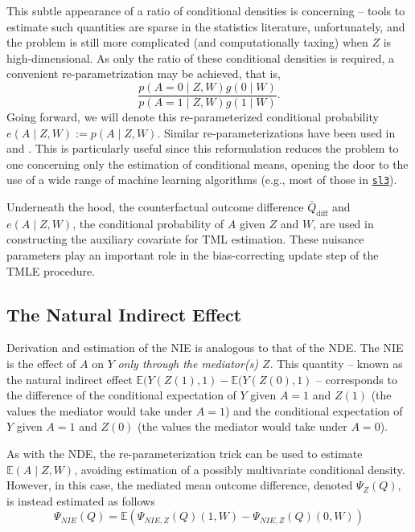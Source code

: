 \documentclass[12pt, krantz2,]{krantz}
\theoremstyle{definition}
\theoremstyle{definition}
\theoremstyle{definition}
\newcommand{\E}{\mathbb{E}}
\newcommand{\1}{\mathbbm{1}}
\begin{document}
This subtle appearance of a ratio of conditional densities is concerning --
tools to estimate such quantities are sparse in the statistics literature,
unfortunately, and the problem is still more complicated (and computationally
taxing) when \(Z\) is high-dimensional. As only the ratio of these conditional
densities is required, a convenient re-parametrization may be achieved, that is,
\begin{equation*}
  \frac{p(A = 0 \mid Z, W) g(0 \mid W)}{p(A = 1 \mid Z, W) g(1 \mid W)}.
\end{equation*}
Going forward, we will denote this re-parameterized conditional probability
\(e(A \mid Z, W) := p(A \mid Z, W)\). Similar re-parameterizations have been used
in \citet{zheng2012targeted} and \citet{tchetgen2013inverse}. This is particularly useful
since this reformulation reduces the problem to one concerning only the
estimation of conditional means, opening the door to the use of a wide range of
machine learning algorithms (e.g., most of those in
\href{https://github.com/tlverse/sl3}{\texttt{sl3}}).

Underneath the hood, the counterfactual outcome difference
\(\bar{Q}_{\text{diff}}\) and \(e(A \mid Z, W)\), the conditional probability of \(A\)
given \(Z\) and \(W\), are used in constructing the auxiliary covariate for TML
estimation. These nuisance parameters play an important role in the
bias-correcting update step of the TMLE procedure.

\hypertarget{the-natural-indirect-effect}{%
\subsection{The Natural Indirect Effect}\label{the-natural-indirect-effect}}

Derivation and estimation of the NIE is analogous to that of the NDE. The NIE
is the effect of \(A\) on \(Y\) \emph{only through the mediator(s) \(Z\)}. This quantity
-- known as the natural indirect effect \(\E(Y(Z(1), 1) - \E(Y(Z(0), 1)\) --
corresponds to the difference of the conditional expectation of \(Y\) given \(A = 1\) and \(Z(1)\) (the values the mediator would take under \(A = 1\)) and the
conditional expectation of \(Y\) given \(A = 1\) and \(Z(0)\) (the values the mediator
would take under \(A = 0\)).

As with the NDE, the re-parameterization trick can be used to estimate \(\E(A \mid Z, W)\), avoiding estimation of a possibly multivariate conditional density.
However, in this case, the mediated mean outcome difference, denoted
\(\Psi_Z(Q)\), is instead estimated as follows
\begin{equation*}
  \Psi_{NIE}(Q) = \E (\Psi_{NIE, Z}(Q)(1, W) - \Psi_{NIE, Z}(Q)(0, W))
\end{equation*}
\end{document}
